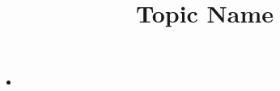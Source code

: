 \documentclass{article}
\title{Topic Name}
\date{}
\begin{document}
\maketitle
 
\begin{itemize}
\item

\end{itemize}
\end{document}
